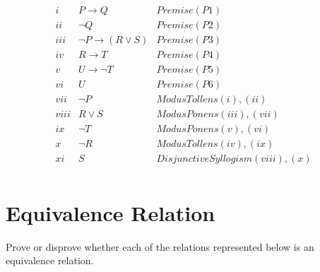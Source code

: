 \documentclass[addpoints]{exam}
\begin{document}
\begin{questions}
\begin{solution}
\[\begin{array}{c|c|c}
        \hline
        i            & P \rightarrow Q               & Premise (P1)                      \\
        ii           & \neg Q                        & Premise (P2)                      \\
        iii          & \neg P \rightarrow (R \vee S) & Premise (P3)                      \\
        iv           & R \rightarrow T               & Premise (P4)                      \\
        v            & U \rightarrow \neg T          & Premise (P5)                      \\
        vi           & U                             & Premise (P6)                      \\
        vii          & \neg P                        & Modus Tollens (i), (ii)           \\
        viii         & R \vee S                      & Modus Ponens (iii), (vii)         \\
        ix           & \neg T                        & Modus Ponens (v), (vi)            \\
        x            & \neg R                        & Modus Tollens (iv), (ix)          \\
        xi           & S                             & Disjunctive Syllogism (viii), (x) \\
      \end{array}
    \]
  \end{solution}
  
  \section{Equivalence Relation}
  
\question Prove or disprove whether each of the relations represented below is an equivalence relation.
\end{questions}
\end{document}
